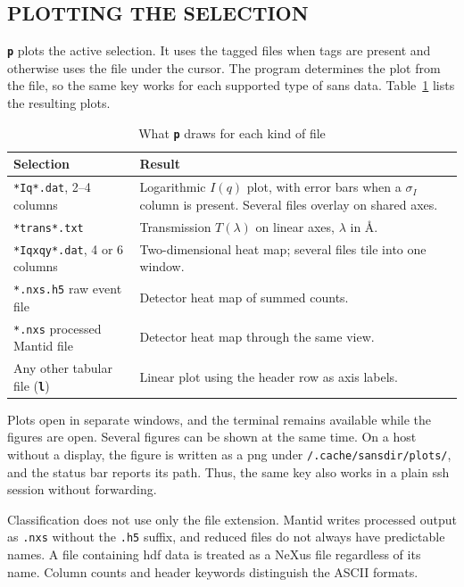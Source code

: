 \documentclass[tm]{ornltm}
\newcommand{\key}[1]{\textbf{\texttt{#1}}}
\newcommand{\hme}{\raisebox{0.4ex}{\texttildelow}}
\begin{document}
\subsection{PLOTTING THE SELECTION}

\key{p} plots the active selection. It uses the tagged files when tags are
present and otherwise uses the file under the cursor. The program determines the
plot from the file, so the same key works for each supported type of \ac{sans}
data. Table~\ref{tab:plotrouting} lists the resulting plots.

\begin{table}[ht]
  \centering
  \caption{What \key{p} draws for each kind of file}
  \label{tab:plotrouting}
  \small
  \begin{tabular}{p{} p{}}
    \toprule
    Selection & Result \\
    \midrule
    \texttt{*Iq*.dat}, 2--4 columns & Logarithmic $I(q)$ plot, with error bars
      when a $\sigma_I$ column is present. Several files overlay on shared
      axes. \\
    \texttt{*trans*.txt} & Transmission $T(\lambda)$ on linear axes,
      $\lambda$ in \AA. \\
    \texttt{*Iqxqy*.dat}, 4 or 6 columns & Two-dimensional heat map; several
      files tile into one window. \\
    \texttt{*.nxs.h5} raw event file & Detector heat map of summed counts. \\
    \texttt{*.nxs} processed Mantid file & Detector heat map through the same
      view. \\
    Any other tabular file (\key{l}) & Linear plot using the header row as axis
      labels. \\
    \bottomrule
  \end{tabular}
\end{table}

Plots open in separate windows, and the terminal remains available while the
figures are open. Several figures can be shown at the same time. On a host
without a display, the figure is written as a \ac{png} under
\texttt{\hme/.cache/sansdir/plots/}, and the status bar reports its path. Thus,
the same key also works in a plain \ac{ssh} session without forwarding.

Classification does not use only the file extension. Mantid writes processed
output as \texttt{.nxs} without the \texttt{.h5} suffix, and reduced files do not
always have predictable names. A file containing \ac{hdf} data is treated as a
NeXus file regardless of its name. Column counts and header keywords distinguish
the ASCII formats.
\end{document}
